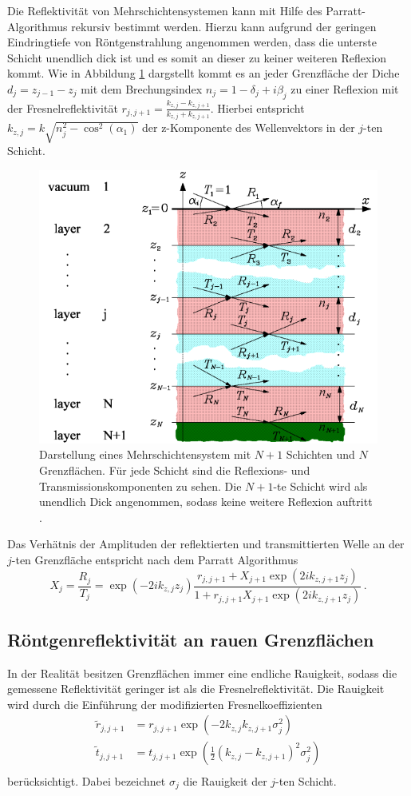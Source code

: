 Die Reflektivität von Mehrschichtensystemen kann mit Hilfe des Parratt-Algorithmus rekursiv bestimmt werden.
Hierzu kann aufgrund der geringen Eindringtiefe von Röntgenstrahlung angenommen werden, dass die unterste Schicht unendlich dick ist und es somit an dieser zu keiner weiteren Reflexion kommt.
Wie in Abbildung \ref{fig:tfig4} dargstellt kommt es an jeder Grenzfläche der Diche $d_j = z_{j-1}-z_j$ mit dem Brechungsindex $n_j=1-\delta_j+i\beta_j$ zu einer Reflexion mit der Fresnelreflektivität $r_{j, j+1}=\frac{k_{z,j}-k_{z,j+1}}{k_{z,j}+k_{z,j+1}}$.
Hierbei entspricht $k_{z,j}= k\sqrt{n_j^2-\cos^2(\alpha_1)}$ der z-Komponente des Wellenvektors in der $j$-ten Schicht.
\begin{figure}[H]
\centering
\includegraphics[width=0.7\linewidth]{figures/Parratt}
\caption{Darstellung eines Mehrschichtensystem mit $N+1$ Schichten und $N$ Grenzflächen.
Für jede Schicht sind die Reflexions- und Transmissionskomponenten zu sehen.
Die $N+1$-te Schicht wird als unendlich Dick angenommen, sodass keine weitere Reflexion auftritt \cite{skript}.}
\label{fig:tfig4}
\end{figure}
Das Verhätnis der Amplituden der reflektierten und transmittierten Welle an der $j$-ten Grenzfläche entspricht nach dem Parratt Algorithmus
\begin{equation}
    X_j = \frac{R_j}{T_j}=\exp(-2ik_{z,j}z_j)\frac{r_{j, j+1}+X_{j+1}\exp(2ik_{z,j+1}z_j)}{1+r_{j,j+1}X_{j+1}\exp(2ik_{z,j+1}z_j)}\, .
\end{equation}

\subsection{Röntgenreflektivität an rauen Grenzflächen}
In der Realität besitzen Grenzflächen immer eine endliche Rauigkeit, sodass die gemessene Reflektivität geringer ist als die Fresnelreflektivität.
Die Rauigkeit wird durch die Einführung der modifizierten Fresnelkoeffizienten
\begin{align}
    \tilde{r}_{j, j+1} &= r_{j,j+1}\exp\left(-2k_{z,j}k_{z,j+1}\sigma_j^2\right)\\
    \tilde{t}_{j, j+1} &= t_{j,j+1}\exp\left(\frac{1}{2}(k_{z,j}-k_{z,j+1})^2\sigma_j^2\right )\\
\end{align}
berücksichtigt. Dabei bezeichnet $\sigma_j$ die Rauigkeit der $j$-ten Schicht.

